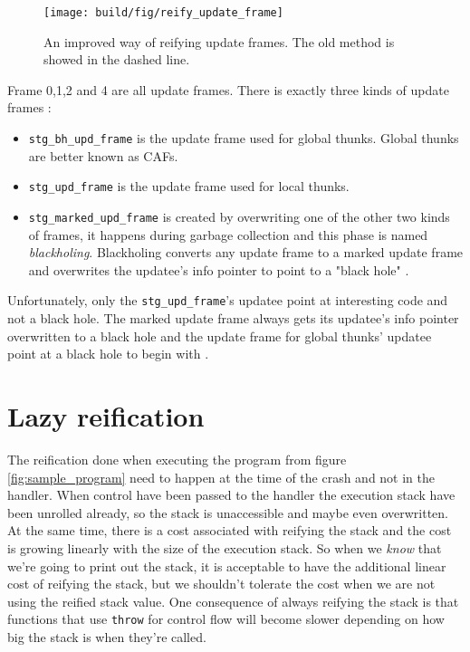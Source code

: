 \begin{figure}
\begin{mdframed}
  \texttt{[image: build/fig/reify\_update\_frame]}
  \caption{An improved way of reifying update frames. The old method is
  showed in the dashed line.}
  \label{fig:reify_update_frame}
\end{mdframed}
\end{figure}

Frame 0,1,2 and 4 are all update frames. There is exactly three kinds
of update frames \cite{github_updates_cmm}:

\begin{itemize}
  \item
    \texttt{stg\_bh\_upd\_frame} is the update frame used for global
      thunks. Global thunks are better known as CAFs.
  \item
    \texttt{stg\_upd\_frame} is the update frame used for local
  thunks. \item \texttt{stg\_marked\_upd\_frame} is created
  by overwriting one of the other two kinds of frames, it
  happens during garbage collection and this phase is named
  \emph{blackholing}. Blackholing converts any update frame to a
  marked update frame \cite{github_overwrite_update_frame} and
  overwrites the updatee's info pointer to point to a "black hole"
  \cite{github_overwrite_blackhole}.
\end{itemize}

Unfortunately, only the \texttt{stg\_upd\_frame}'s updatee point
at interesting code and not a black hole. The marked update frame
always gets its updatee's info pointer overwritten to a black
hole \cite{github_overwrite_blackhole} and the update frame
for global thunks' updatee point at a black hole to begin with
\cite{github_set_hdr_caf_blackhole}.

\section{Lazy reification}

The reification done when executing the program from figure
\ref{fig:sample_program} need to happen at the time of the crash and
not in the handler. When control have been passed to the handler the
execution stack have been unrolled already, so the stack is unaccessible
and maybe even overwritten. At the same time, there is a cost associated
with reifying the stack and the cost is growing linearly with the size
of the execution stack. So when we \emph{know} that we're going to print
out the stack, it is acceptable to have the additional linear cost of
reifying the stack, but we shouldn't tolerate the cost when we are not
using the reified stack value. One consequence of always reifying the
stack is that functions that use \texttt{throw} for control flow will
become slower depending on how big the stack is when they're called.

